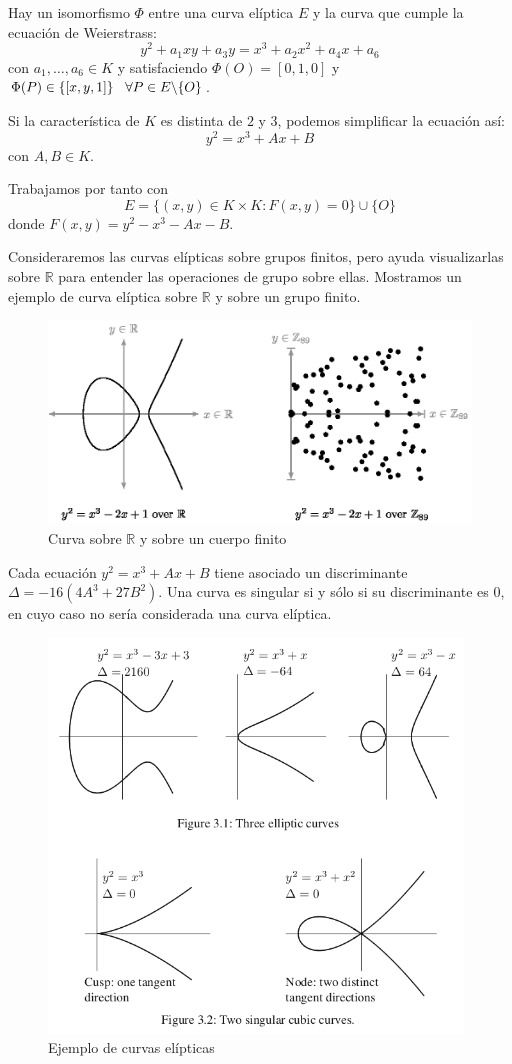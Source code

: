 \documentclass{article}
\begin{document}
Hay un isomorfismo $\Phi$ entre una curva elíptica $E$ y la curva que
cumple la ecuación de Weierstrass:
$$ y^2 + a_1xy + a_3y = x^3 + a_2x^2 + a_4x + a_6$$
con $a_1, \ldots, a_6 \in K$ y satisfaciendo $\Phi(O) = [0,1,0]$ y
$\Phi(P) \in \{[x,y,1]\} \hspace{3mm} \forall P \in E \backslash
\{O\}$.

Si la característica de $K$ es distinta de $2$ y $3$, podemos
simplificar la ecuación así:
$$y^2 = x^3 + Ax + B$$ con $A, B \in K$.

Trabajamos por tanto con \[E=\{(x,y)\in K\times
K:F(x,y)=0\}\cup\{O\}\] donde $F(x,y)=y^2-x^3-Ax-B$.

Consideraremos las curvas elípticas sobre grupos finitos, pero ayuda
visualizarlas sobre $\mathbb{R}$ para entender las operaciones de
grupo sobre ellas. Mostramos un ejemplo de curva elíptica sobre
$\mathbb{R}$ y sobre un grupo finito.

\begin{figure}[H] \centering
  \includegraphics[width=120mm]{imagenes/curvas_Fp}
  \caption{Curva sobre $\mathbb{R}$ y sobre un cuerpo finito}
\end{figure}

Cada ecuación $y^2 = x^3 + Ax + B$ tiene asociado un discriminante $
\Delta = -16(4A^3 + 27B^2)$. Una curva es singular si y sólo si su
discriminante es $0$, en cuyo caso no sería considerada una curva
elíptica.

\begin{figure}[H] \centering
  \includegraphics[width=110mm]{imagenes/curvas}
  \caption{Ejemplo de curvas elípticas}
\end{figure}
\end{document}
